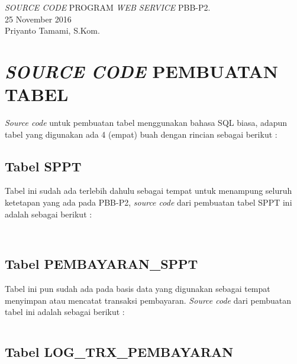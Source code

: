 \documentclass[pdftex,12pt, oneside]{article}
\begin{document}
\sloppy %

\begin{center}
{\large \textit{SOURCE CODE} PROGRAM \textit{WEB SERVICE} PBB-P2.}
\\[1cm]
25 November 2016\\
Priyanto Tamami, S.Kom.
\end{center}




\section{\textit{SOURCE CODE} PEMBUATAN TABEL}

\textit{Source code} untuk pembuatan tabel menggunakan bahasa SQL biasa, adapun tabel yang digunakan ada 4 (empat) buah dengan rincian sebagai berikut :


  \subsection{Tabel SPPT}
  
  Tabel ini sudah ada terlebih dahulu sebagai tempat untuk menampung seluruh ketetapan yang ada pada PBB-P2, \textit{source code} dari pembuatan tabel SPPT ini adalah sebagai berikut :
  
  \begin{lstlisting}
    
  \end{lstlisting}
  
  \subsection{Tabel PEMBAYARAN\_SPPT}
  
  Tabel ini pun sudah ada pada basis data yang digunakan sebagai tempat menyimpan atau mencatat transaksi pembayaran. \textit{Source code} dari pembuatan tabel ini adalah sebagai berikut :
  
  \begin{lstlisting}
  \end{lstlisting}
  
  \subsection{Tabel LOG\_TRX\_PEMBAYARAN}
  
\end{document}
